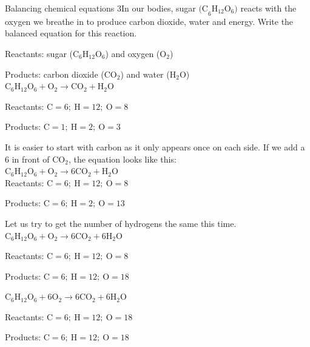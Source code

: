       \noindent
\par
            \label{m38726*secfhsst!!!underscore!!!id590}
      \noindent
\begin{wex}{Balancing chemical equations 3}{In our bodies, sugar ${\text{(C}_{6}\text{H}_{12}\text{O}_{6}\text{)}}$ reacts with the oxygen we breathe in to produce carbon dioxide, water and energy. Write the balanced equation for this reaction.}

{
Reactants: sugar (${\text{C}_{6}\text{H}_{12}\text{O}_{6}}$) and oxygen (${\text{O}_{2}}$)

Products: carbon dioxide (${\text{CO}_{2}}$) and water (${\text{H}_{2}\text{O}}$)\\

    $\text{C}_{6}\text{H}_{12}\text{O}_{6} + \text{O}_{2} \rightarrow \text{CO}_{2} + \text{H}_{2}\text{O}$

   Reactants: $\text{C} = 6;~ \text{H} = 12; ~\text{O} = 8$

   Products: $\text{C} = 1;~ \text{H} = 2; ~\text{O} = 3$

   It is easier to start with carbon as it only appears once on each side. If we add a $6$ in front of ${\text{CO}_{2}}$, the equation looks like this:\\
    $\text{C}_{6}\text{H}_{12}\text{O}_{6} + \text{O}_{2} \rightarrow 6\text{CO}_{2} + \text{H}_{2}\text{O}$\\

   Reactants: $\text{C} = 6;~ \text{H} = 12; ~\text{O} = 8$

   Products: $\text{C} = 6;~ \text{H} = 2; ~\text{O} = 13$

Let us try to get the number of hydrogens the same this time.\\
    $\text{C}_{6}\text{H}_{12}\text{O}_{6} + \text{O}_{2} \rightarrow 6\text{CO}_{2} + 6\text{H}_{2}\text{O}$

   Reactants: $\text{C} = 6;~ \text{H} = 12; ~\text{O} = 8$

   Products: $\text{C} = 6;~ \text{H} = 12; ~\text{O} = 18$

  $\text{C}_{6}\text{H}_{12}\text{O}_{6} + 6\text{O}_{2} \rightarrow 6\text{CO}_{2} + 6\text{H}_{2}\text{O}$

   Reactants: $\text{C} = 6;~ \text{H} = 12; ~\text{O} = 18$

   Products: $\text{C} = 6;~ \text{H} = 12; ~\text{O} = 18$
}
\end{wex}
